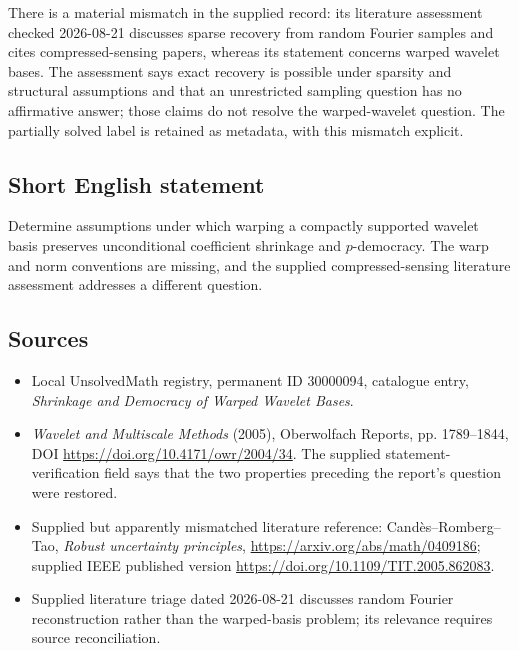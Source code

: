 \documentclass[11pt]{article}
\begin{document}
There is a material mismatch in the supplied record: its literature assessment checked 2026-08-21 discusses sparse recovery from random Fourier samples and cites compressed-sensing papers, whereas its statement concerns warped wavelet bases. The assessment says exact recovery is possible under sparsity and structural assumptions and that an unrestricted sampling question has no affirmative answer; those claims do not resolve the warped-wavelet question. The partially solved label is retained as metadata, with this mismatch explicit.
\subsection{Short English statement}
Determine assumptions under which warping a compactly supported wavelet basis preserves unconditional coefficient shrinkage and \(p\)-democracy. The warp and norm conventions are missing, and the supplied compressed-sensing literature assessment addresses a different question.
\subsection{Sources}
\begin{itemize}
\item Local UnsolvedMath registry, permanent ID 30000094, catalogue entry, \emph{Shrinkage and Democracy of Warped Wavelet Bases}.
\item \emph{Wavelet and Multiscale Methods} (2005), Oberwolfach Reports, pp. 1789--1844, DOI \url{https://doi.org/10.4171/owr/2004/34}. The supplied statement-verification field says that the two properties preceding the report's question were restored.
\item Supplied but apparently mismatched literature reference: Cand\`es--Romberg--Tao, \emph{Robust uncertainty principles}, \url{https://arxiv.org/abs/math/0409186}; supplied IEEE published version \url{https://doi.org/10.1109/TIT.2005.862083}.
\item Supplied literature triage dated 2026-08-21 discusses random Fourier reconstruction rather than the warped-basis problem; its relevance requires source reconciliation.
\end{itemize}
\end{document}

